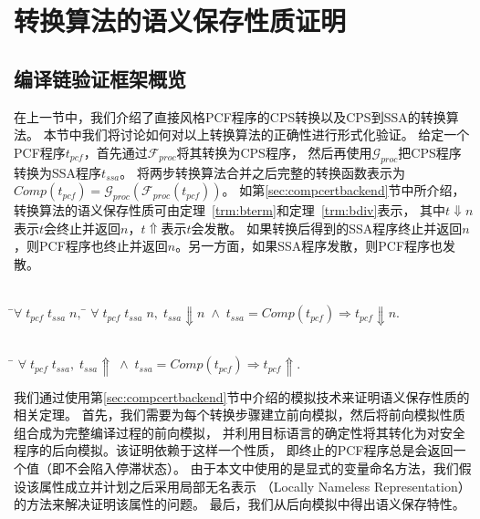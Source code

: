 
\chapter{转换算法的语义保存性质证明} \label{ch:verify}

\section{编译链验证框架概览} \label{sec:verifyoverview}

在上一节中，我们介绍了直接风格PCF程序的CPS转换以及CPS到SSA的转换算法。
本节中我们将讨论如何对以上转换算法的正确性进行形式化验证。
给定一个PCF程序$t_{pcf}$，首先通过$\mathcal{F}_{proc}$将其转换为CPS程序，
然后再使用$\mathcal{G}_{proc}$把CPS程序转换为SSA程序$t_{ssa}$。
将两步转换算法合并之后完整的转换函数表示为$Comp(t_{pcf}) = \mathcal{G}_{proc}(\mathcal{F}_{proc}(t_{pcf}))$。
如第\ref{sec:compcertbackend}节中所介绍，转换算法的语义保存性质可由定理~\ref{trm:bterm}和定理~\ref{trm:bdiv}表示，
其中$t \Downarrow n$表示$t$会终止并返回$n$，$t \Uparrow$表示$t$会发散。
如果转换后得到的SSA程序终止并返回$n$，则PCF程序也终止并返回$n$。另一方面，如果SSA程序发散，则PCF程序也发散。

\begin{theorem}[程序终止行为的保存]\label{trm:bterm} 
    \begin{tabbing}
     \\
    \quad\=$\forall \; t_{pcf}\; t_{ssa}\; n,\; $\=\kill
    \>$\forall \; t_{pcf}\; t_{ssa}\; n,\; t_{ssa}\Downarrow n\; \wedge \; t_{ssa}=Comp(t_{pcf}) \Longrightarrow t_{pcf}\Downarrow n.$
    \end{tabbing}
  \end{theorem}
  
  \begin{theorem}[程序发散行为的保存]\label{trm:bdiv}
    \begin{tabbing}
      \\
    \quad\=\kill
    \>$\forall \; t_{pcf}\; t_{ssa},\; t_{ssa}\Uparrow\; \wedge \; t_{ssa}=Comp(t_{pcf})\Longrightarrow t_{pcf}\Uparrow.$
    \end{tabbing}
  \end{theorem}

我们通过使用第\ref{sec:compcertbackend}节中介绍的模拟技术来证明语义保存性质的相关定理。
首先，我们需要为每个转换步骤建立前向模拟，然后将前向模拟性质组合成为完整编译过程的前向模拟，
并利用目标语言的确定性将其转化为对安全程序的后向模拟。该证明依赖于这样一个性质，
即终止的PCF程序总是会返回一个值（即不会陷入停滞状态）。
由于本文中使用的是显式的变量命名方法，我们假设该属性成立并计划之后采用局部无名表示
（Locally Nameless Representation）的方法来解决证明该属性的问题。
最后，我们从后向模拟中得出语义保存特性。

